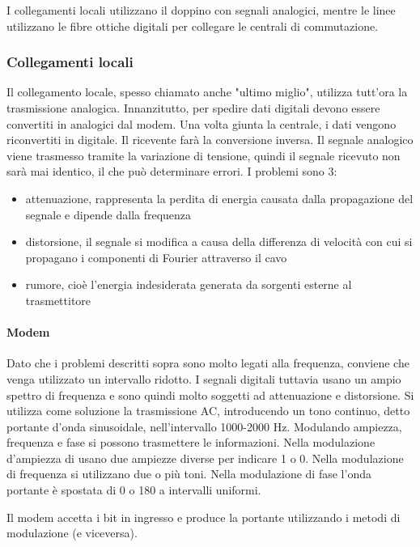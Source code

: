 I collegamenti locali utilizzano il doppino con segnali analogici, mentre le linee utilizzano le fibre ottiche digitali per collegare le centrali di commutazione.

\subsubsection{Collegamenti locali}
Il collegamento locale, spesso chiamato anche "ultimo miglio", utilizza tutt'ora la trasmissione analogica.
Innanzitutto, per spedire dati digitali devono essere convertiti in analogici dal modem. 
Una volta giunta la centrale, i dati vengono riconvertiti in digitale.
Il ricevente farà la conversione inversa.
Il segnale analogico viene trasmesso tramite la variazione di tensione, quindi il segnale ricevuto non sarà mai identico, il che può determinare errori.
I problemi sono 3:
\begin{itemize}
    \item attenuazione, rappresenta la perdita di energia causata dalla propagazione del segnale e dipende dalla frequenza
    \item distorsione, il segnale si modifica a causa della differenza di velocità con cui si propagano i componenti di Fourier attraverso il cavo
    \item rumore, cioè l'energia indesiderata generata da sorgenti esterne al trasmettitore
\end{itemize}

\paragraph{Modem}
Dato che i problemi descritti sopra sono molto legati alla frequenza, conviene che venga utilizzato un intervallo ridotto.
I segnali digitali tuttavia usano un ampio spettro di frequenza e sono quindi molto soggetti ad attenuazione e distorsione.
Si utilizza come soluzione la trasmissione AC, introducendo un tono continuo, detto portante d'onda sinusoidale, nell'intervallo 1000-2000 Hz.
Modulando ampiezza, frequenza e fase si possono trasmettere le informazioni.
Nella modulazione d'ampiezza di usano due ampiezze diverse per indicare 1 o 0.
Nella modulazione di frequenza si utilizzano due o più toni.
Nella modulazione di fase l'onda portante è spostata di 0 o 180 a intervalli uniformi.

Il modem accetta i bit in ingresso e produce la portante utilizzando i metodi di modulazione (e viceversa).


